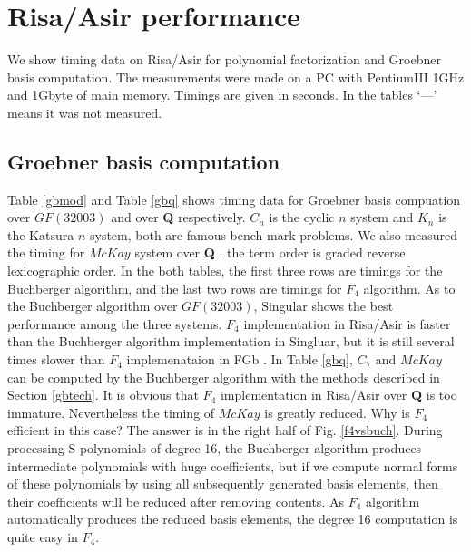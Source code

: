 \documentclass[runningheads]{cl2emult}
\begin{document}

\section{Risa/Asir performance}

We show timing data on Risa/Asir for polynomial factorization
and Groebner basis computation. The measurements were made on
a PC with PentiumIII 1GHz and 1Gbyte of main memory. Timings
are given in seconds. In the tables `---' means it was not
measured.

\subsection{Groebner basis computation}

Table \ref{gbmod} and Table \ref{gbq} shows timing data for Groebner
basis compuation over $GF(32003)$ and over {\bf Q} respectively.
$C_n$ is the cyclic $n$ system and $K_n$ is the Katsura $n$ system,
both are famous bench mark problems.  We also measured the timing for
$McKay$ system over {\bf Q} \cite{REPL}.  the term order is graded
reverse lexicographic order.  In the both tables, the first three rows
are timings for the Buchberger algorithm, and the last two rows are
timings for $F_4$ algorithm. As to the Buchberger algorithm over
$GF(32003)$, Singular\cite{SINGULAR} shows the best performance among
the three systems. $F_4$ implementation in Risa/Asir is faster than
the Buchberger algorithm implementation in Singluar, but it is still
several times slower than $F_4$ implemenataion in FGb \cite{FGB}.  In
Table \ref{gbq}, $C_7$ and $McKay$ can be computed by the Buchberger
algorithm with the methods described in Section \ref{gbtech}.  It is
obvious that $F_4$ implementation in Risa/Asir over {\bf Q} is too
immature. Nevertheless the timing of $McKay$ is greatly reduced.
Why is $F_4$ efficient in this case? The answer is in the right
half of Fig. \ref{f4vsbuch}. During processing S-polynomials of degree
16, the Buchberger algorithm produces intermediate polynomials with
huge coefficients, but if we compute normal forms of these polynomials
by using all subsequently generated basis elements, then their
coefficients will be reduced after removing contents. As $F_4$
algorithm automatically produces the reduced basis elements, the
degree 16 computation is quite easy in $F_4$.
\end{document}
